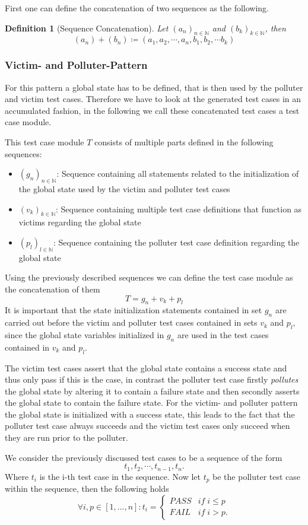 \documentclass[
fancyheadings, %
%
%
]{stsreprt}
\newtheorem{definition}{Definition}
\begin{document}
First one can define the concatenation of two sequences as the following.
\begin{definition}[Sequence Concatenation]
    Let $(a_n)_{n \in \mathbb{N}}$ and $(b_k)_{k \in \mathbb{N}}$, then
    \[
       (a_n) + (b_n) \coloneqq (a_1, a_2, \cdots , a_n, b_1, b_2, \cdots b_k)
    \]
\end{definition}
\subsubsection{Victim- and Polluter-Pattern}
For this pattern a global state has to be defined, that is then used by the polluter and victim test cases. 
Therefore we have to look at the generated test cases in an accumulated fashion, in the following we call these concatenated test cases a test case module. \par
This test case module $T$ consists of multiple parts defined in the following sequences:
\begin{itemize}
    \item $(g_n)_{n \in \mathbb{N}}$: Sequence containing all statements related to the initialization of the global state used by the victim and polluter test cases
    \item $(v_k)_{k \in \mathbb{N}}$: Sequence containing multiple test case definitions that function as victims regarding the global state
    \item $(p_l)_{l \in \mathbb{N}}$: Sequence containing the polluter test case definition regarding the global state
\end{itemize}
Using the previously described sequences we can define the test case module as the concatenation of them
\[
    T = g_n + v_k + p_l 
\]
It is important that the state initialization statements contained in set $g_n$ are carried out before the victim and polluter test cases contained in sets $v_k$ and $p_l$, since the global state variables initialized in $g_n$ are used in the test cases contained in $v_k$ and $p_l$. \par
The victim test cases assert that the global state contains a success state and thus only pass if this is the case, in contrast the polluter test case firstly \textit{pollutes} the global state by altering it to contain a failure state and then secondly asserts the global state to contain the failure state. 
For the victim- and polluter pattern the global state is initialized with a success state, this leads to the fact that the polluter test case always succeeds and the victim test cases only succeed when they are run prior to the polluter. \par
We consider the previously discussed test cases to be a sequence of the form
\[
    t_1, t_2, \cdots, t_{n-1}, t_n.
\]
Where $t_i$ is the i-th test case in the sequence. Now let $t_p$ be the polluter test case within the sequence, then the following holds
\begin{equation*}
\forall i,p \in [1, ..., n]:
t_i=
    \begin{cases}
        PASS  & if \; i \leq p  \\
        FAIL  & if \; i > p .
    \end{cases}
\end{equation*}
\end{document}
